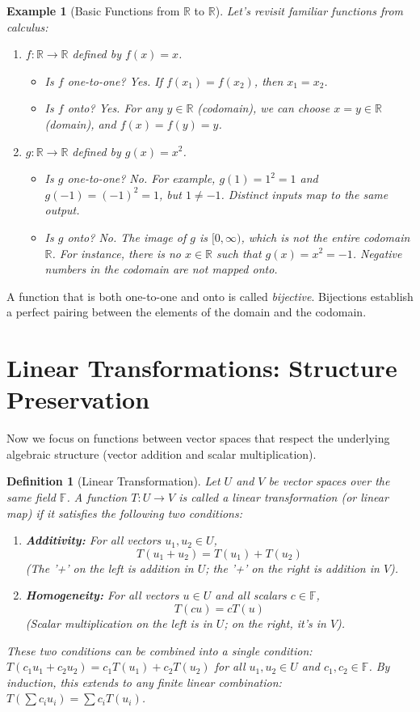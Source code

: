 \documentclass[11pt, letterpaper]{article}
\theoremstyle{mytheoremstyle}
\theoremstyle{mydefinitionstyle}
\newtheorem{definition}[theorem]{Definition}
\newtheorem{example}[theorem]{Example}
\theoremstyle{myremarkstyle}
\newcommand{\F}{\mathbb{F}}
\newcommand{\R}{\mathbb{R}}
\begin{document}
\begin{example}[Basic Functions from $\R$ to $\R$]
Let's revisit familiar functions from calculus:
\begin{enumerate}
    \item $f: \R \to \R$ defined by $f(x) = x$.
        \begin{itemize}
            \item Is $f$ one-to-one? Yes. If $f(x_1) = f(x_2)$, then $x_1 = x_2$.
            \item Is $f$ onto? Yes. For any $y \in \R$ (codomain), we can choose $x = y \in \R$ (domain), and $f(x) = f(y) = y$.
        \end{itemize}
    \item $g: \R \to \R$ defined by $g(x) = x^2$.
        \begin{itemize}
            \item Is $g$ one-to-one? No. For example, $g(1) = 1^2 = 1$ and $g(-1) = (-1)^2 = 1$, but $1 \neq -1$. Distinct inputs map to the same output.
            \item Is $g$ onto? No. The image of $g$ is $[0, \infty)$, which is not the entire codomain $\R$. For instance, there is no $x \in \R$ such that $g(x) = x^2 = -1$. Negative numbers in the codomain are not mapped onto.
        \end{itemize}
\end{enumerate}
\end{example}

A function that is both one-to-one and onto is called \emph{bijective}. Bijections establish a perfect pairing between the elements of the domain and the codomain.

\section{Linear Transformations: Structure Preservation}

Now we focus on functions between vector spaces that respect the underlying algebraic structure (vector addition and scalar multiplication).

\begin{definition}[Linear Transformation]
Let $U$ and $V$ be vector spaces over the same field $\F$. A function $T: U \to V$ is called a \emph{linear transformation} (or linear map) if it satisfies the following two conditions:
\begin{enumerate}
    \item \textbf{Additivity:} For all vectors $u_1, u_2 \in U$,
    \[ T(u_1 + u_2) = T(u_1) + T(u_2) \]
    (The '+' on the left is addition in $U$; the '+' on the right is addition in $V$).
    \item \textbf{Homogeneity:} For all vectors $u \in U$ and all scalars $c \in \F$,
    \[ T(c u) = c T(u) \]
    (Scalar multiplication on the left is in $U$; on the right, it's in $V$).
\end{enumerate}
These two conditions can be combined into a single condition: $T(c_1 u_1 + c_2 u_2) = c_1 T(u_1) + c_2 T(u_2)$ for all $u_1, u_2 \in U$ and $c_1, c_2 \in \F$. By induction, this extends to any finite linear combination: $T(\sum c_i u_i) = \sum c_i T(u_i)$.
\end{definition}
\end{document}
